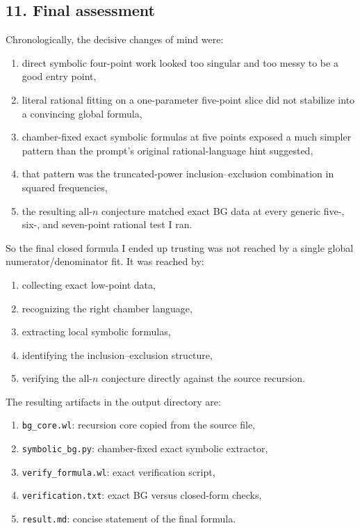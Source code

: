 \documentclass[11pt]{article}
\begin{document}
\subsection*{11. Final assessment}

Chronologically, the decisive changes of mind were:

\begin{enumerate}
\item direct symbolic four-point work looked too singular and too messy to be a
good entry point,
\item literal rational fitting on a one-parameter five-point slice did not
stabilize into a convincing global formula,
\item chamber-fixed exact symbolic formulas at five points exposed a much simpler
pattern than the prompt's original rational-language hint suggested,
\item that pattern was the truncated-power inclusion--exclusion combination in
squared frequencies,
\item the resulting all-$n$ conjecture matched exact BG data at every generic
five-, six-, and seven-point rational test I ran.
\end{enumerate}

So the final closed formula I ended up trusting was not reached by a single
global numerator/denominator fit. It was reached by:

\begin{enumerate}
\item collecting exact low-point data,
\item recognizing the right chamber language,
\item extracting local symbolic formulas,
\item identifying the inclusion--exclusion structure,
\item verifying the all-$n$ conjecture directly against the source recursion.
\end{enumerate}

The resulting artifacts in the output directory are:

\begin{enumerate}
\item \texttt{bg\_core.wl}: recursion core copied from the source file,
\item \texttt{symbolic\_bg.py}: chamber-fixed exact symbolic extractor,
\item \texttt{verify\_formula.wl}: exact verification script,
\item \texttt{verification.txt}: exact BG versus closed-form checks,
\item \texttt{result.md}: concise statement of the final formula.
\end{enumerate}
\end{document}
